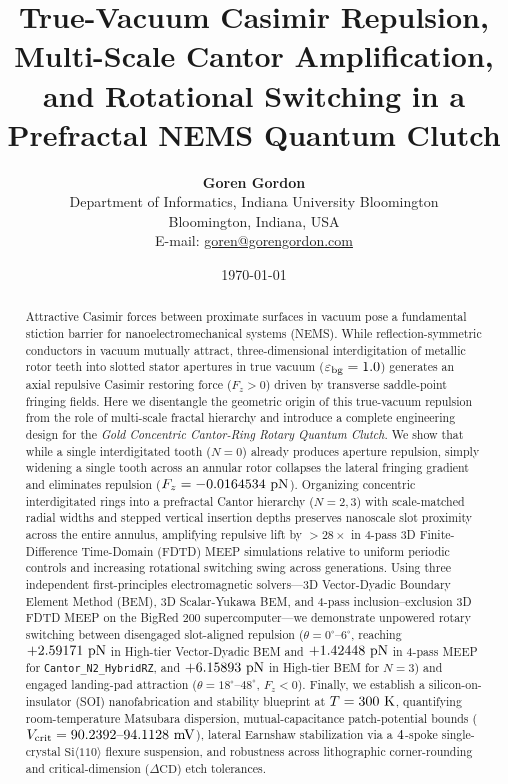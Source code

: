 \documentclass[11pt,letterpaper]{article}
\title{\textbf{True-Vacuum Casimir Repulsion, Multi-Scale Cantor Amplification, and Rotational Switching in a Prefractal NEMS Quantum Clutch}}
\author{\textbf{Goren Gordon} \\
Department of Informatics, Indiana University Bloomington \\
Bloomington, Indiana, USA \\
E-mail: \href{mailto:goren@gorengordon.com}{goren@gorengordon.com}}
\date{\today}
\begin{document}
\maketitle

\begin{abstract}
Attractive Casimir forces between proximate surfaces in vacuum pose a fundamental stiction barrier for nanoelectromechanical systems (NEMS). While reflection-symmetric conductors in vacuum mutually attract, three-dimensional interdigitation of metallic rotor teeth into slotted stator apertures in true vacuum ($\varepsilon_{\rm bg}=1.0$) generates an axial repulsive Casimir restoring force ($F_z > 0$) driven by transverse saddle-point fringing fields. Here we disentangle the geometric origin of this true-vacuum repulsion from the role of multi-scale fractal hierarchy and introduce a complete engineering design for the \emph{Gold Concentric Cantor-Ring Rotary Quantum Clutch}. We show that while a single interdigitated tooth ($N=0$) already produces aperture repulsion, simply widening a single tooth across an annular rotor collapses the lateral fringing gradient and eliminates repulsion ($F_z = -0.0164534{}\text{ pN}$). Organizing concentric interdigitated rings into a prefractal Cantor hierarchy ($N=2, 3$) with scale-matched radial widths and stepped vertical insertion depths preserves nanoscale slot proximity across the entire annulus, amplifying repulsive lift by $>28\times$ in 4-pass 3D Finite-Difference Time-Domain (FDTD) MEEP simulations relative to uniform periodic controls and increasing rotational switching swing across generations. Using three independent first-principles electromagnetic solvers---3D Vector-Dyadic Boundary Element Method (BEM), 3D Scalar-Yukawa BEM, and 4-pass inclusion--exclusion 3D FDTD MEEP on the BigRed 200 supercomputer---we demonstrate unpowered rotary switching between disengaged slot-aligned repulsion ($\theta=0^\circ\text{--}6^\circ$, reaching $+2.59171{}\text{ pN}$ in High-tier Vector-Dyadic BEM and $+1.42448{}\text{ pN}$ in 4-pass MEEP for \texttt{Cantor\_N2\_HybridRZ}, and $+6.15893{}\text{ pN}$ in High-tier BEM for $N=3$) and engaged landing-pad attraction ($\theta=18^\circ\text{--}48^\circ$, $F_z < 0$). Finally, we establish a silicon-on-insulator (SOI) nanofabrication and stability blueprint at $T = 300{}\text{ K}$, quantifying room-temperature Matsubara dispersion, mutual-capacitance patch-potential bounds ($V_{\rm crit} = 90.2392{}\text{--}94.1128{}\text{ mV}$), lateral Earnshaw stabilization via a $4{}$-spoke single-crystal $\text{Si}\langle 110\rangle$ flexure suspension, and robustness across lithographic corner-rounding and critical-dimension ($\Delta\text{CD}$) etch tolerances.
\end{abstract}
\end{document}
